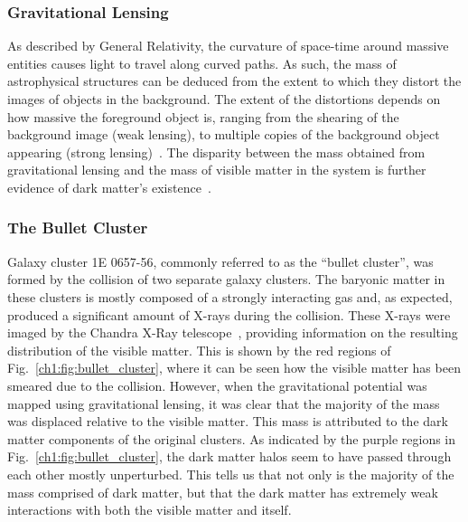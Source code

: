 \subsubsection*{Gravitational Lensing}

As described by General Relativity, the curvature of space-time around massive entities causes light to travel along curved paths. 
As such, the mass of astrophysical structures can be deduced from the extent to which they distort the images of objects in the background. The extent of the distortions depends on how massive the foreground object is, ranging from the shearing of the background image (weak lensing), to multiple copies of the background object appearing (strong lensing)~\cite{Schneider_Gravitationallensingstrong}.  The disparity between the mass obtained from gravitational lensing and the mass of visible matter in the system is further evidence of dark matter's existence~\cite{SDSS:2005sxd_FourthDataRelease, Mandelbaum:2005nx_Galaxyhalomasses}. 

\subsubsection*{The Bullet Cluster}
Galaxy cluster 1E 0657-56, commonly referred to as the ``bullet cluster'', was formed by the collision of two separate galaxy clusters. 
The baryonic matter in these clusters is mostly composed of a strongly interacting gas and, as expected, produced a significant amount of X-rays during the collision. These X-rays were imaged by the Chandra X-Ray telescope~\cite{Clowe:2003tk_Weaklensingmass}, providing information on the resulting distribution of the visible matter. This is shown by the red regions of Fig.~\ref{ch1:fig:bullet_cluster}, where it can be seen how the visible matter has been smeared due to the collision. 
However, when the gravitational potential was mapped using gravitational lensing, it was clear that the majority of the mass was displaced relative to the visible matter. This mass is attributed to the dark matter components of the original clusters. As indicated by the purple regions in Fig.~\ref{ch1:fig:bullet_cluster}, the dark matter halos seem to have passed through each other mostly unperturbed. This tells us that not only is the majority of the mass comprised of dark matter, but that the dark matter has extremely weak interactions with both the visible matter and itself. 

